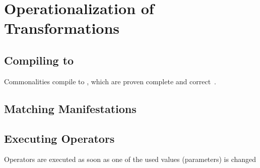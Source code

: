 \section{Operationalization of Transformations}

\subsection{Compiling to \reactions}
Commonalities compile to \reactions, which are proven complete and correct~\cite{kramer2017a}.


\subsection{Matching Manifestations}

\subsection{Executing Operators}

Operators are executed as soon as one of the used values (parameters) is changed